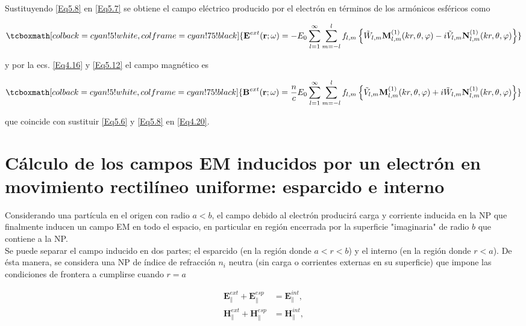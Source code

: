 \documentclass[a4paper,10pt]{article}
\begin{document}
Sustituyendo \eqref{Eq5.8} en \eqref{Eq5.7} se obtiene el campo eléctrico producido por el electrón en términos de los armónicos esféricos como

\begin{equation}\tcboxmath[colback=cyan!5!white,colframe=cyan!75!black]{
\textbf{E}^{ext}(\textbf{r};\omega)=-E_0\sum_{l=1}^{\infty}\sum_{m=-l}^lf_{l,m}	\left\{ \tilde{W}_{l,m}\textbf{M}_{l,m}^{(1)}(kr,\theta,\varphi)-i\tilde{V}_{l,m}\textbf{N}_{l,m}^{(1)}(kr,\theta,\varphi)	\right\}}
\label{Eq5.10}
\end{equation}

y por la ecs. \eqref{Eq4.16} y \eqref{Eq5.12} el campo magnético es

\begin{equation}\tcboxmath[colback=cyan!5!white,colframe=cyan!75!black]{
\textbf{B}^{ext}(\textbf{r};\omega)=\frac{n}{c}E_0\sum_{l=1}^{\infty}\sum_{m=-l}^lf_{l,m}	\left\{	\tilde{V}_{l,m}\textbf{M}_{l,m}^{(1)}(kr,\theta,\varphi)+i\tilde{W}_{l,m}\textbf{N}_{l,m}^{(1)}(kr,\theta,\varphi)	\right\}}
\label{Eq5.11}
\end{equation}

que coincide con sustituir \eqref{Eq5.6} y \eqref{Eq5.8} en \eqref{Eq4.20}.

\section{\large{Cálculo de los campos EM inducidos por un electrón en movimiento rectilíneo uniforme: esparcido e interno}}

\setcounter{equation}{0}


Considerando una partícula en el origen con radio $a<b$, el campo debido al electrón producirá carga y corriente inducida en la NP que finalmente inducen un campo EM en todo el espacio, en particular en región encerrada por la superficie "imaginaria" de radio $b$ que contiene a la NP.
\\
Se puede separar el campo inducido en dos partes; el esparcido (en la región donde $a<r<b$) y el interno (en la región donde $r<a$). De ésta manera, se considera una NP de índice de refracción $n_i$ neutra (sin carga o corrientes externas en su superficie) que impone las condiciones de frontera a cumplirse cuando $r=a$

\begin{subequations}
\begin{align}
\textbf{E}^{ext}_{\|}+\textbf{E}^{esp}_{\|}	&=\textbf{E}^{int}_{\|},	\\
\textbf{H}^{ext}_{\|}+\textbf{H}^{esp}_{\|}	&=\textbf{H}^{int}_{\|},
\end{align}
\end{subequations}
\end{document}
